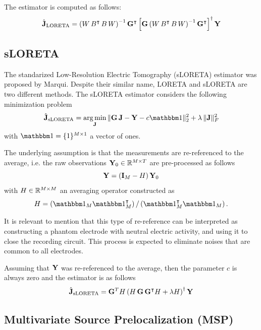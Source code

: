 The estimator is computed as follows:
\begin{equation}
\hat{\mathbf{J}}_\text{LORETA} 
= 
\left(  W\, B^\intercal\, B\, W  \right)^{-1}
\mathbf{G}^\intercal
\left[  \mathbf{G} \left(  W\, B^\intercal\, B\, W  \right)^{-1} \mathbf{G}^\intercal  \right]^\dagger
\mathbf{Y}
\label{est:LORETA}
\end{equation}

\subsection{sLORETA}

The standarized Low-Resolution Electric Tomography (sLORETA) estimator was proposed by Marqui\cite{sloreta}.
%
Despite their similar name, LORETA and sLORETA are two different methods.
%
The sLORETA estimator considers the following minimization problem
\begin{equation}
\hat{\J}_\text{sLORETA} 
= 
\argmin_{\J}\, \nnorm{\G\, \J - \Y - c \ones }_2^2 + \lambda\, \nnorm{\J}_F^2
\end{equation}
with $\ones=\{1\}^{M\times 1}$ a vector of ones.

The underlying assumption is that the measurements are re-referenced to the average, i.e. the raw observations $\mathbf{Y}_0\in \mathbb{R}^{M\times T}$ are pre-processed as follows
\begin{equation}
\mathbf{Y} = \left(  \mathbf{I}_M - H  \right) \mathbf{Y}_0
\end{equation}
with $H \in \mathbb{R}^{M \times M}$ an averaging operator constructed as
\begin{equation}
H = \ppar{\ones_M \ones_M\trans}/\ppar{\ones_M\trans \ones_M}.
\end{equation}

It is relevant to mention that this type of re-reference can be interpreted as constructing a phantom electrode with neutral electric activity, and using it to close the recording circuit.
%
This process is expected to eliminate noises that are common to all electrodes.

Assuming that $\mathbf{Y}$ was re-referenced to the average, then the parameter $c$ is always zero and the estimator is as follows
\begin{equation}
\hat{\mathbf{J}}_{\text{sLORETA}} =
\mathbf{G}^T H 
\left( 
H\, \mathbf{G} \,\mathbf{G}^\intercal 
H + 
\lambda H
 \right)^\dagger
\mathbf{Y}
\label{est:sLORETA}
\end{equation}

\subsection{Multivariate Source Prelocalization (MSP)}

